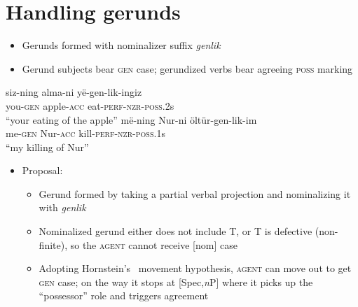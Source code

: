 \documentclass[letterpaper,12pt]{article}
\newcommand{\poss}[2]{\textsc{poss}.{\footnotesize #1}#2}
\newcommand{\posst}{\textsc{poss}}
\newcommand{\gen}{\textsc{gen}}
\begin{document}
\section{\Large{Handling gerunds}}
\begin{itemize}
\item Gerunds formed with nominalizer suffix \textsl{genlik}
\item Gerund subjects bear \gen{} case; gerundized verbs bear agreeing \posst{} marking
\end{itemize}
\begin{exe}
\ex
	\begin{xlist}
	\ex \gll siz-ning alma-ni y\"e-gen-lik-ingiz\\
					 you-\gen{} apple-\textsc{acc} eat-\textsc{perf}-\textsc{nzr}-\poss{2}{s}\\
			\glt ``your eating of the apple''
	\ex \gll m\"e-ning Nur-ni \"olt\"ur-gen-lik-im\\
					 me-\gen{} Nur-\textsc{acc} kill-\textsc{perf}-\textsc{nzr}-\poss{1}{s}\\
			\glt ``my killing of Nur''
	\end{xlist}
\end{exe}
\begin{itemize}
\item Proposal:
	\begin{itemize}
	\item Gerund formed by taking a partial verbal projection and nominalizing it with \textsl{genlik}~\cite{Kratzer}
	\item Nominalized gerund either does not include T, or T is defective (non-finite), so the \textsc{agent} cannot receive [nom] case
	\item Adopting Hornstein's~\citeyear{Hornstein} movement hypothesis, \textsc{agent} can move out to get \gen{} case; on the way it stops at [Spec,\textit{n}P] where it picks up the ``possessor'' role and triggers agreement
	\end{itemize}
\end{itemize}
\end{document}
